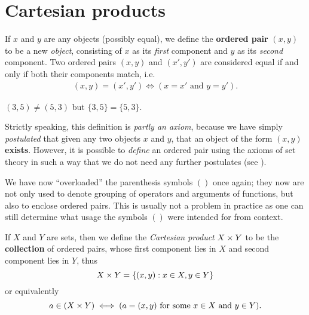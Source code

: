 \section{Cartesian products} \label{sec 3.5}

\begin{definition}  \label{def 3.5.1}
If \(x\) and \(y\) are any objects (possibly equal), we define the \textbf{ordered pair} \((x, y)\) to be a new \emph{object}, consisting of \(x\) as its \emph{first} component and \(y\) as its \emph{second} component.
Two ordered pairs \((x, y)\) and \((x', y')\) are considered equal if and only if both their components match, i.e.
\begin{align} \label{formula 3.5}
    (x, y) = (x', y') \iff (x = x' \text{\ and\ } y = y').
\end{align}
\end{definition}

\begin{note}
\((3, 5) \neq (5, 3)\) but \(\{ 3, 5 \} = \{ 5, 3 \}\).
\end{note}

\begin{remark} \label{remark 3.5.2}
Strictly speaking, this definition is \emph{partly an axiom}, because we have simply \emph{postulated} that given any two objects \(x\) and \(y\), that an object of the form \((x, y)\) \textbf{exists}.
However, it is possible to \emph{define} an ordered pair using the axioms of set theory in such a way that we do not need any further postulates (see ).
\end{remark}

\begin{remark} \label{remark 3.5.3}
We have now ``overloaded'' the parenthesis symbols \(()\) once again;
they now are not only used to denote grouping of operators and arguments of functions, but also to enclose ordered pairs.
This is usually not a problem in practice as one can still determine what usage the symbols \(()\) were intended for from context.
\end{remark}

\begin{definition}  \label{def 3.5.4}
If \(X\) and \(Y\) are sets, then we define the \emph{Cartesian product} \(X \times Y\) to be the \textbf{collection} of ordered pairs, whose first component lies in \(X\) and second component lies in \(Y\),
thus
\[
    X \times Y = \{ (x, y): x \in X, y \in Y \}
\]
or equivalently
\[
    a \in (X \times Y ) \iff (a = (x, y) \text{\ for some \(x \in X\) and \(y \in Y\)}).
\]
\end{definition}

